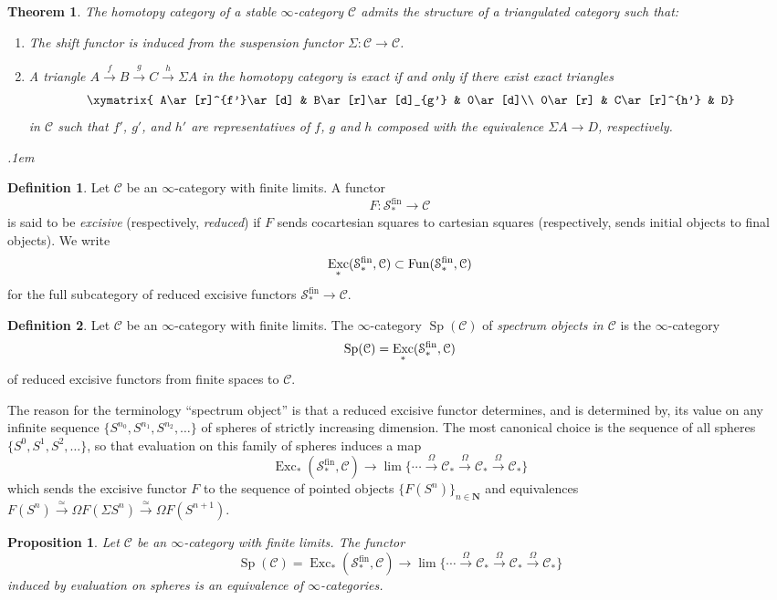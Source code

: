 \documentclass{article}
\newtheorem{theorem}{Theorem}[subsection]
\newtheorem{proposition}{Proposition}[subsection]
\theoremstyle{definition}
\newtheorem{definition}{Definition}[subsection]
\newcommand{\C}{\mathcal{C}}
\renewcommand{\S}{\mathcal{S}}
\newcommand{\NN}{\mathbf{N}}
\renewcommand{\i}{\infty}
\newcommand{\too}{\longrightarrow}
\DeclareMathOperator{\Exc}{Exc}
\DeclareMathOperator{\f}{fin}
\DeclareMathOperator{\Fun}{Fun}
\DeclareMathOperator{\Sp}{Sp}
\DeclareMathOperator{\fin}{fin}
\begin{document}
\begin{theorem}{\em \cite[Lemma 1.1.2.13]{HA}}
The homotopy category of a stable $\infty$-category $\C$ admits the structure of a triangulated category such that:
\begin{enumerate}\itemsep.1em
\item[\emph{(1)}]
The shift functor is induced from the suspension functor $\Sigma:\C\to\C$.
\item[\emph{(2)}]
A triangle $A\overset{f}{\to} B\overset{g}{\to} C\overset{h}{\to}\Sigma A$ in the homotopy category is exact if and only if there exist exact triangles
\[
\xymatrix{
A\ar[r]^{f'}\ar[d] & B\ar[r]\ar[d]_{g'} & 0\ar[d]\\
0\ar[r] & C\ar[r]^{h'} & D}
\]
in $\C$ such that $f'$, $g'$, and $h'$ are representatives of $f$, $g$ and $h$ composed with the equivalence $\Sigma A\to D$, respectively.
\end{enumerate}\itemsep.1em
\end{theorem}
\begin{definition}
Let $\C$ be an $\infty$-category with finite limits.
A functor
\[
F:\S_*^{\f}\too\C
\]
is said to be {\em excisive} (respectively, {\em reduced}) if $F$ sends cocartesian squares to cartesian squares (respectively, sends initial objects to final objects).
We write
\[
\Exc_*(\S_*^{\f},\C)\subset\Fun(\S_*^{\f},\C)\index{$\mathrm{\Exc_*}$}
\]
for the full subcategory of reduced excisive functors $\S_*^{\f}\to\C$.
\end{definition}
\begin{definition}
Let $\C$ be an $\infty$-category with finite limits.
The $\infty$-category $\Sp(\C)$ of {\em spectrum objects in $\C$} is the $\infty$-category
\[
\Sp(\C)=\Exc_*(\S_*^{\fin},\C)\index{$\Sp(\C)$}\index{spectrum object}
\]
of reduced excisive functors from finite spaces to $\C$.
\end{definition}
The reason for the terminology ``spectrum object'' is that a reduced excisive functor determines, and is determined by, its value on any infinite sequence $\{S^{n_0}, S^{n_1}, S^{n_2},\ldots\}$ of spheres of strictly increasing dimension.
The most canonical choice is the sequence of all spheres $\{S^0,S^1,S^2,\ldots\}$, so that evaluation on this family of spheres induces a map
\[
\Exc_*(\S_*^{\fin},\C)\too\lim\{\cdots\overset{\Omega}{\to}\C_*\overset{\Omega}{\to}\C_*\overset{\Omega}{\to}\C_*\}
\]
which sends the excisive functor $F$ to the sequence of pointed objects $\{F(S^n)\}_{n\in\NN}$ and equivalences 
$F(S^n)\overset{\simeq}{\too}\Omega F(\Sigma S^n)\overset{\simeq}{\too}\Omega F(S^{n+1})$.
\begin{proposition}{\em \cite[Remark 1.4.2.25]{HA}}
Let $\C$ be an $\i$-category with finite limits. The functor
\[
\Sp(\C)=\Exc_*(\S^{\fin}_*,\C)\too\lim\{\cdots\overset{\Omega}{\to}\C_*\overset{\Omega}{\to}\C_*\overset{\Omega}{\to}\C_*\}
\]
induced by evaluation on spheres is an equivalence of $\i$-categories.
\end{proposition}
\end{document}
